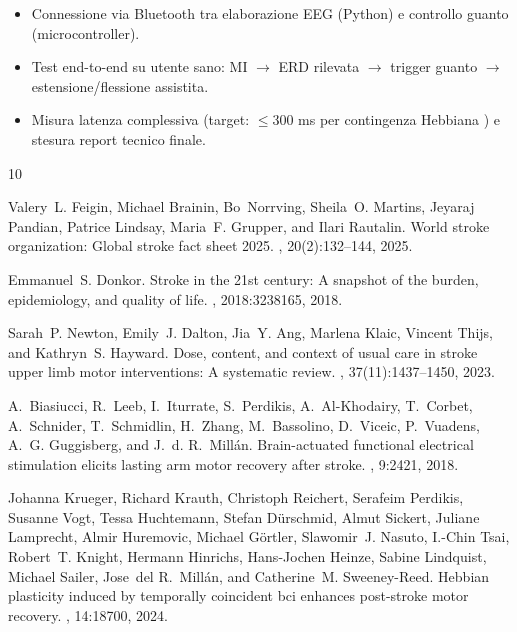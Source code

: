 \documentclass[a4paper,11pt]{article}
\begin{document}
\begin{enumerate}
    \begin{itemize}
        \item Connessione via Bluetooth tra elaborazione EEG (Python) e controllo
        guanto (microcontroller).
        \item Test end-to-end su utente sano: MI $\to$ ERD rilevata $\to$
        trigger guanto $\to$ estensione/flessione assistita.
        \item Misura latenza complessiva (target: $\leq$300 ms per contingenza
        Hebbiana \cite{biasiucci2018brain, krueger2024hebbian}) e stesura
        report tecnico finale.
    \end{itemize}
\end{enumerate}

\newpage

\begin{thebibliography}{10}

Valery~L. Feigin, Michael Brainin, Bo~Norrving, Sheila~O. Martins, Jeyaraj
  Pandian, Patrice Lindsay, Maria~F. Grupper, and Ilari Rautalin.
\newblock World stroke organization: Global stroke fact sheet 2025.
, 20(2):132--144, 2025.

Emmanuel~S. Donkor.
\newblock Stroke in the 21st century: A snapshot of the burden, epidemiology,
  and quality of life.
, 2018:3238165, 2018.

Sarah~P. Newton, Emily~J. Dalton, Jia~Y. Ang, Marlena Klaic, Vincent Thijs,
  and Kathryn~S. Hayward.
\newblock Dose, content, and context of usual care in stroke upper limb motor
  interventions: A systematic review.
, 37(11):1437--1450, 2023.

A.~Biasiucci, R.~Leeb, I.~Iturrate, S.~Perdikis, A.~Al-Khodairy, T.~Corbet,
  A.~Schnider, T.~Schmidlin, H.~Zhang, M.~Bassolino, D.~Viceic, P.~Vuadens,
  A.~G. Guggisberg, and J.~d. R.~Mill{\'a}n.
\newblock Brain-actuated functional electrical stimulation elicits lasting arm
  motor recovery after stroke.
, 9:2421, 2018.

Johanna Krueger, Richard Krauth, Christoph Reichert, Serafeim Perdikis, Susanne
  Vogt, Tessa Huchtemann, Stefan D{\"u}rschmid, Almut Sickert, Juliane
  Lamprecht, Almir Huremovic, Michael G{\"o}rtler, Slawomir~J. Nasuto,
  I.-Chin Tsai, Robert~T. Knight, Hermann Hinrichs, Hans-Jochen Heinze, Sabine
  Lindquist, Michael Sailer, Jose~del R.~Mill{\'a}n, and Catherine~M.
  Sweeney-Reed.
\newblock Hebbian plasticity induced by temporally coincident bci enhances
  post-stroke motor recovery.
, 14:18700, 2024.


\end{thebibliography}
\end{document}
